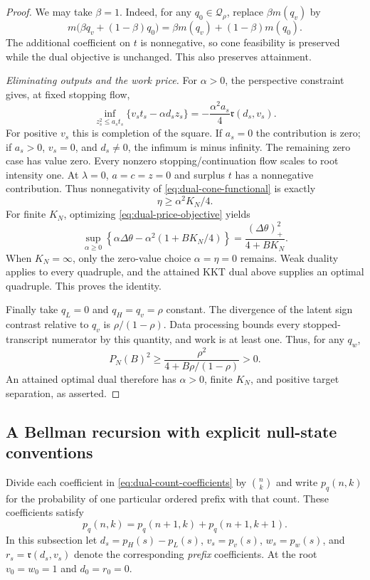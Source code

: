 \begin{proof}
We may take $\beta=1$. Indeed, for any $q_0\in\mathcal Q_\rho$, replace
$\beta m(q_v)$ by
\[
 m\bigl(\beta q_v+(1-\beta)q_0\bigr)
 =\beta m(q_v)+(1-\beta)m(q_0).
\]
The additional coefficient on $t$ is nonnegative, so cone feasibility is
preserved while the dual objective is unchanged. This also preserves
attainment.

\emph{Eliminating outputs and the work price.}
For $\alpha>0$, the perspective constraint gives, at fixed stopping flow,
\[
 \inf_{z_s^2\le a_st_s}
       \{v_st_s-\alpha d_sz_s\}
 =-\frac{\alpha^2a_s}{4}\mathfrak r(d_s,v_s).
\]
For positive $v_s$ this is completion of the square. If $a_s=0$ the
contribution is zero; if $a_s>0$, $v_s=0$, and $d_s\ne0$, the infimum is
minus infinity. The remaining zero case has value zero.
Every nonzero stopping/continuation flow scales to root intensity one.
At $\lambda=0$, $a=c=z=0$ and surplus $t$ has a nonnegative contribution.
Thus nonnegativity of
\eqref{eq:dual-cone-functional} is exactly
\[
 \eta\ge\alpha^2 K_N/4.
\]
For finite $K_N$, optimizing \eqref{eq:dual-price-objective} yields
\[
 \sup_{\alpha\ge0}
 \left\{\alpha\Delta\theta
    -\alpha^2(1+BK_N/4)\right\}
 =\frac{(\Delta\theta)_+^2}{4+BK_N}.
\]
When $K_N=\infty$, only the zero-value choice $\alpha=\eta=0$ remains.
Weak duality applies to every quadruple, and the attained KKT dual above
supplies an optimal quadruple. This proves the identity.

Finally take $q_L=0$ and $q_H=q_v=\rho$ constant. The divergence of the
latent sign contrast relative to $q_v$ is $\rho/(1-\rho)$. Data processing
bounds every stopped-transcript numerator by this quantity, and work is
at least one. Thus, for any $q_w$,
\begin{equation}
 P_N(B)^2\ge\frac{\rho^2}{4+B\rho/(1-\rho)}>0.
 \label{eq:dual-positive-value}
\end{equation}
An attained optimal dual therefore has $\alpha>0$, finite $K_N$, and
positive target separation, as asserted.
\end{proof}

\subsection{A Bellman recursion with explicit null-state conventions}

Divide each coefficient in \eqref{eq:dual-count-coefficients} by
$\binom nk$ and write $p_q(n,k)$ for the probability of one particular
ordered prefix with that count. These coefficients satisfy
\[
 p_q(n,k)=p_q(n+1,k)+p_q(n+1,k+1).
\]
In this subsection let $d_s=p_H(s)-p_L(s)$, $v_s=p_v(s)$,
$w_s=p_w(s)$, and $r_s=\mathfrak r(d_s,v_s)$ denote the corresponding
\emph{prefix} coefficients. At the root $v_0=w_0=1$ and $d_0=r_0=0$.

